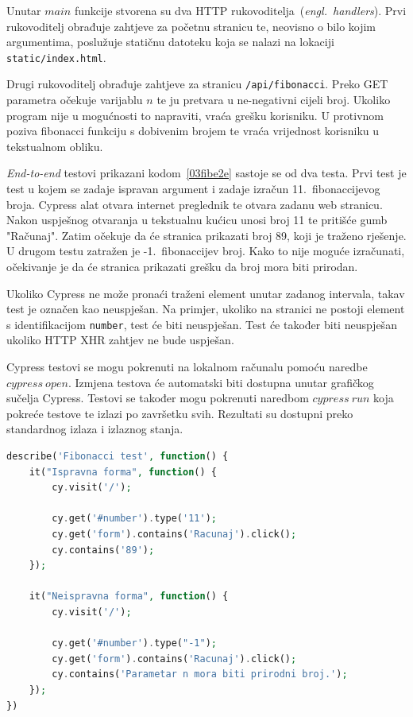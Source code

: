 Unutar $main$ funkcije stvorena su dva HTTP rukovoditelja~(\textit{engl.~handlers}). Prvi
rukovoditelj obrađuje zahtjeve za početnu stranicu te, neovisno o bilo kojim argumentima, poslužuje
statičnu datoteku koja se nalazi na lokaciji \texttt{static/index.html}.

Drugi rukovoditelj obrađuje zahtjeve za stranicu \texttt{/api/fibonacci}. Preko GET parametra
očekuje varijablu $n$ te ju pretvara u ne-negativni cijeli broj. Ukoliko program nije u mogućnosti
to napraviti, vraća grešku korisniku. U protivnom poziva fibonacci funkciju s dobivenim brojem te
vraća vrijednost korisniku u tekstualnom obliku.

\textit{End-to-end} testovi prikazani kodom~\ref{03fibe2e} sastoje se od dva testa. Prvi test je
test u kojem se zadaje ispravan argument i zadaje izračun 11.~fibonaccijevog broja. Cypress alat
otvara internet preglednik te otvara zadanu web stranicu. Nakon uspješnog otvaranja u tekstualnu
kućicu unosi broj 11 te pritišće gumb "Računaj". Zatim očekuje da će stranica prikazati broj 89,
koji je traženo rješenje. U drugom testu zatražen je -1.~fibonaccijev broj. Kako to nije moguće
izračunati, očekivanje je da će stranica prikazati grešku da broj mora biti prirodan.

Ukoliko Cypress ne može pronaći traženi element unutar zadanog intervala, takav test je označen kao
neuspješan. Na primjer, ukoliko na stranici ne postoji element s identifikacijom \texttt{number},
test će biti neuspješan. Test će također biti neuspješan ukoliko HTTP XHR zahtjev ne bude uspješan.

Cypress testovi se mogu pokrenuti na lokalnom računalu pomoću naredbe $cypress~open$. Izmjena
testova će automatski biti dostupna unutar grafičkog sučelja Cypress. Testovi se također mogu
pokrenuti naredbom $cypress~run$ koja pokreće testove te izlazi po završetku svih. Rezultati su
dostupni preko standardnog izlaza i izlaznog stanja.

\begin{lstlisting}[language=php,float=h]
describe('Fibonacci test', function() {
    it("Ispravna forma", function() {
        cy.visit('/');

        cy.get('#number').type('11');
        cy.get('form').contains('Racunaj').click();
        cy.contains('89');
    });

    it("Neispravna forma", function() {
        cy.visit('/');

        cy.get('#number').type("-1");
        cy.get('form').contains('Racunaj').click();
        cy.contains('Parametar n mora biti prirodni broj.');
    });
})
\end{lstlisting}

